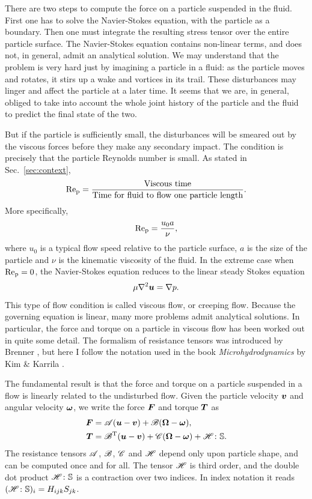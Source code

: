 \documentclass[thesis.tex]{subfiles}
\begin{document}
There are two steps to compute the force on a particle suspended in the fluid. First one has to solve the Navier-Stokes equation, with the particle as a boundary. Then one must integrate the resulting stress tensor over the entire particle surface. The Navier-Stokes equation  contains non-linear terms, and does not, in general, admit an analytical solution. We may understand that the problem is very hard just by imagining a particle in a fluid: as the particle moves and rotates, it stirs up a wake and vortices in its trail. These disturbances may linger and affect the particle at a later time. It seems that we are, in general, obliged to take into account the whole joint history of the particle and the fluid to predict the final state of the two.

But if the particle is sufficiently small, the disturbances will be smeared out by the viscous forces before they make any secondary impact. The condition is precisely that the particle Reynolds number is small. As stated in Sec.~\ref{sec:context},
\begin{align*}
 	\mbox{Re}_{\mathrm p} = \frac{\textrm{Viscous time}}{\textrm{Time for fluid to flow one particle length}}.
\end{align*}
More specifically,
\begin{align*}
	\mbox{Re}_{\mathrm p} = \frac{u_0 a}{\nu},
\end{align*}
where $u_0$ is a typical flow speed relative to the particle surface, $a$ is the size of the particle and $\nu$ is the kinematic viscosity of the fluid. In the extreme case when $\mbox{Re}_{\mathrm p}=0$, the Navier-Stokes equation  reduces to the linear steady Stokes equation \cite{kim1991,kundu2004}
\begin{align*}
	\mu \nabla^2 \mbox{\boldmath$u$} = \nabla p.
\end{align*}
This type of flow condition is called viscous flow, or creeping flow. Because the governing equation is linear, many more problems admit analytical solutions. In particular, the force and torque on a particle in viscous flow has been worked out in quite some detail. The formalism of resistance tensors was introduced by Brenner \cite{brenner1974, happel1965}, but here I follow the notation used in the book \emph{Microhydrodynamics} by Kim \& Karrila \cite{kim1991}.

The fundamental result is that the force and torque on a particle suspended in a flow is linearly related to the undisturbed flow. Given the particle velocity $\mbox{\boldmath$v$}$ and angular velocity $\mbox{\boldmath$\omega$}$, we write the force $\mbox{\boldmath$F$}$ and torque $\mbox{\boldmath$T$}$ as
\begin{align}
	\ve F &= \te A (\ve u - \ve v) + \te B (\ve \Omega - \ve \omega), \nn \\
	\ve T &= \te B\transpose (\ve u - \ve v) + \te C (\ve \Omega - \ve \omega) + \te H \dd \ma S. \eqnlab{resistanceformulation}
\end{align}
The resistance tensors $\mathscr{A}$, $\mathscr{B}$, $\mathscr{C}$ and $\mathscr{H}$ depend only upon particle shape, and can be computed once and for all. The tensor $\mathscr{H}$ is third order, and the double dot product $\mathscr{H} \colon \mathbb{S}$ is a contraction over two indices. In index notation it reads $(\mathscr{H} \colon \mathbb{S})_i = H_{ijk}S_{jk}$. 
\end{document}
